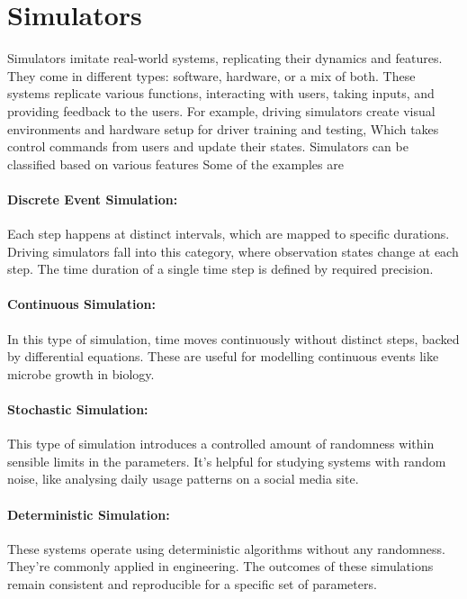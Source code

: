\documentclass[12pt,twoside,a4paper,parskip]{scrbook} %
\begin{document}
\section{Simulators}
Simulators imitate real-world systems, replicating their dynamics and features. They come in different types: software, hardware, or a mix of both. These systems replicate various functions, interacting with users, taking inputs, and providing feedback to the users. For example, driving simulators create visual environments and hardware setup for driver training and testing, Which takes control commands from users and update their states. Simulators can be classified based on various features Some of the examples are
\paragraph*{Discrete Event Simulation:}
Each step happens at distinct intervals, which are mapped to specific durations. Driving simulators fall into this category, where observation states change at each step. The time duration of a single time step is defined by required precision.
\paragraph*{Continuous Simulation:} In this type of simulation, time moves continuously without distinct steps, backed by differential equations. These are useful for modelling continuous events like microbe growth in biology.
\paragraph*{Stochastic Simulation:}
This type of simulation introduces a controlled amount of randomness within sensible limits in the parameters. It's helpful for studying systems with random noise, like analysing daily usage patterns on a social media site.
\paragraph*{Deterministic Simulation:}
These systems operate using deterministic algorithms without any randomness. They're commonly applied in engineering. The outcomes of these simulations remain consistent and reproducible for a specific set of parameters.
\end{document}
